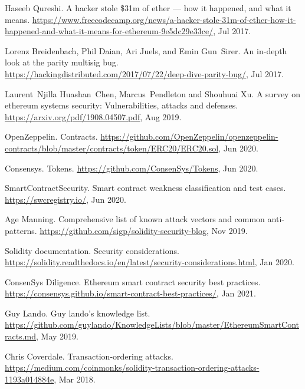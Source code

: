 \begin{thebibliography}{10}
Haseeb Qureshi.
\newblock A hacker stole \$31m of ether --- how it happened, and what it means.
\newblock
  \url{https://www.freecodecamp.org/news/a-hacker-stole-31m-of-ether-how-it-happened-and-what-it-means-for-ethereum-9e5dc29e33ce/},
  Jul 2017.

Lorenz Breidenbach, Phil Daian, Ari Juels, and Emin Gun~Sirer.
\newblock An in-depth look at the parity multisig bug.
\newblock
  \url{https://hackingdistributed.com/2017/07/22/deep-dive-parity-bug/}, Jul
  2017.

Laurent~Njilla Huashan~Chen, Marcus~Pendleton and Shouhuai Xu.
\newblock A survey on ethereum systems security: Vulnerabilities, attacks and
  defenses.
\newblock \url{https://arxiv.org/pdf/1908.04507.pdf}, Aug 2019.

OpenZeppelin.
\newblock Contracts.
\newblock
  \url{https://github.com/OpenZeppelin/openzeppelin-contracts/blob/master/contracts/token/ERC20/ERC20.sol},
  Jun 2020.

Consensys.
\newblock Tokens.
\newblock \url{https://github.com/ConsenSys/Tokens}, Jun 2020.

SmartContractSecurity.
\newblock Smart contract weakness classification and test cases.
\newblock \url{https://swcregistry.io/}, Jun 2020.

Age Manning.
\newblock Comprehensive list of known attack vectors and common anti-patterns.
\newblock \url{https://github.com/sigp/solidity-security-blog}, Nov 2019.

Solidity documentation.
\newblock Security considerations.
\newblock
  \url{https://solidity.readthedocs.io/en/latest/security-considerations.html},
  Jan 2020.

ConsenSys Diligence.
\newblock Ethereum smart contract security best practices.
\newblock \url{https://consensys.github.io/smart-contract-best-practices/}, Jan
  2021.

Guy Lando.
\newblock Guy lando's knowledge list.
\newblock
  \url{https://github.com/guylando/KnowledgeLists/blob/master/EthereumSmartContracts.md},
  May 2019.

Chris Coverdale.
\newblock Transaction-ordering attacks.
\newblock
  \url{https://medium.com/coinmonks/solidity-transaction-ordering-attacks-1193a014884e},
  Mar 2018.


\end{thebibliography}
